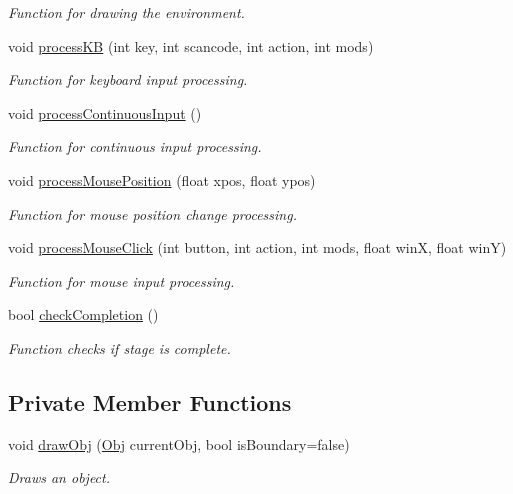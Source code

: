 \begin{DoxyCompactItemize}
\begin{DoxyCompactList}\small\item\em Function for drawing the environment. \end{DoxyCompactList}\item 
void \hyperlink{class_stage_ab0ac39aba2fa162499d2599c981ca3ed}{process\+KB} (int key, int scancode, int action, int mods)
\begin{DoxyCompactList}\small\item\em Function for keyboard input processing. \end{DoxyCompactList}\item 
void \hyperlink{class_stage_a92feebde5c5fd84711ce19f0e4d07552}{process\+Continuous\+Input} ()\hypertarget{class_stage_a92feebde5c5fd84711ce19f0e4d07552}{}\label{class_stage_a92feebde5c5fd84711ce19f0e4d07552}

\begin{DoxyCompactList}\small\item\em Function for continuous input processing. \end{DoxyCompactList}\item 
void \hyperlink{class_stage_ae7a66771756db91c1c0bbe6ed469b9d4}{process\+Mouse\+Position} (float xpos, float ypos)
\begin{DoxyCompactList}\small\item\em Function for mouse position change processing. \end{DoxyCompactList}\item 
void \hyperlink{class_stage_a2c54bf08d29f9f117541bf4006f58c10}{process\+Mouse\+Click} (int button, int action, int mods, float winX, float winY)
\begin{DoxyCompactList}\small\item\em Function for mouse input processing. \end{DoxyCompactList}\item 
bool \hyperlink{class_stage_a6f65f2412b7f72e508ac46889dcca0b6}{check\+Completion} ()
\begin{DoxyCompactList}\small\item\em Function checks if stage is complete. \end{DoxyCompactList}\end{DoxyCompactItemize}
\subsection*{Private Member Functions}
\begin{DoxyCompactItemize}
\item 
void \hyperlink{class_stage_a5b5a75287919c5478294e7a168ddd60b}{draw\+Obj} (\hyperlink{class_obj}{Obj} current\+Obj, bool is\+Boundary=false)
\begin{DoxyCompactList}\small\item\em Draws an object. \end{DoxyCompactList}\end{DoxyCompactItemize}
